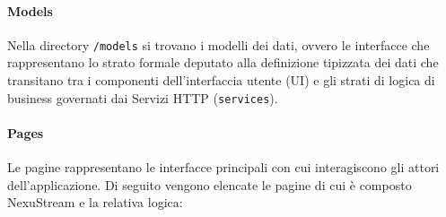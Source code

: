 \documentclass[11pt,a4paper]{article}
\begin{document}
\paragraph{Models}
Nella directory \texttt{/models} si trovano i modelli dei dati, ovvero le interfacce che rappresentano lo strato formale deputato alla definizione tipizzata dei dati che transitano tra i componenti dell'interfaccia utente (UI) e gli strati di logica di business governati dai Servizi HTTP (\texttt{services}).

\paragraph{Pages}
Le pagine rappresentano le interfacce principali con cui interagiscono gli attori dell’applicazione. Di seguito vengono elencate le pagine di cui è composto NexuStream e la relativa logica:
\end{document}
